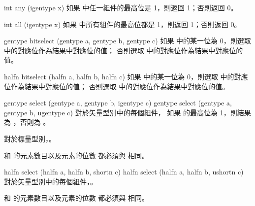 int any (igentype x)
\stopbuffer
{}
如果  中任一組件的最高位是 1，則返回 1；否則返回 0。
\stopbuffer

int all (igentype x)
\stopbuffer
{}
如果  中所有組件的最高位都是 1，則返回 1；否則返回 0。
\stopbuffer

gentype bitselect (gentype a,
		gentype b,
		gentype c)
\stopbuffer
{}
如果  中的某一位為 0，則選取  中的對應位作為結果中對應位的值；
否則選取  中的對應位作為結果中對應位的值。
\stopbuffer

halfn bitselect (halfn a,
		halfn b,
		halfn c)
\stopbuffer
{}
如果  中的某一位為 0，則選取  中的對應位作為結果中對應位的值；
否則選取  中的對應位作為結果中對應位的值。
\stopbuffer

gentype select (gentype a,
		gentype b,
		igentype c)
gentype select (gentype a,
		gentype b,
		ugentype c)
\stopbuffer
{}
對於矢量型別中的每個組件，
如果  的最高位為 1，則結果為 ，否則為 。

對於標量型別，。

 和  的元素數目以及元素的位數
都必須與  相同。
\stopbuffer

halfn select (halfn a,
		halfn b,
		shortn c)
halfn select (halfn a,
		halfn b,
		ushortn c)
\stopbuffer
{}
對於矢量型別中的每個組件，。

 和  的元素數目以及元素的位數
都必須與  相同。
\stopbuffer
